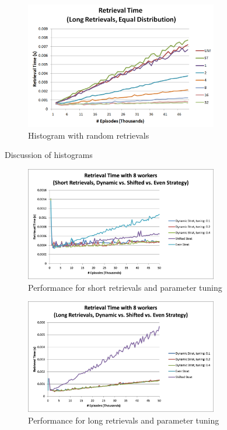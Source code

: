 \documentclass[11pt]{article} %
\begin{document}
\begin{figure}[h]
\caption{Histogram with random retrievals}
\centering
\includegraphics[width=0.75\textwidth]{images/ret_worst_eq}
\end{figure}

Discussion of histograms

\begin{figure}[h]
\caption{Performance for short retrievals and parameter tuning}
\centering
\includegraphics[width=0.75\textwidth]{images/alldynamicshort}
\end{figure}

\begin{figure}[h]
\caption{Performance for long retrievals and parameter tuning}
\centering
\includegraphics[width=0.75\textwidth]{images/alldynamiclong}
\end{figure}
\end{document}
